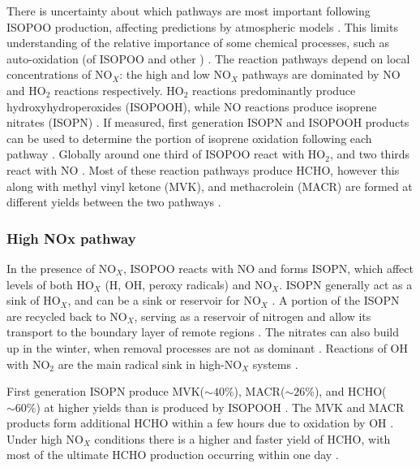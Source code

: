       There is uncertainty about which pathways are most important following ISOPOO production, affecting predictions by atmospheric models \parencite{Nguyen2014}.
      This limits understanding of the relative importance of some chemical processes, such as auto-oxidation (of ISOPOO and other \roo) \parencite{Crounse2013}.
      The reaction pathways depend on local concentrations of NO$_X$: the high and low NO$_X$ pathways are dominated by NO and HO$_2$ reactions respectively.
      HO$_2$ reactions predominantly produce hydroxyhydroperoxides (ISOPOOH), while NO reactions produce isoprene nitrates (ISOPN) \parencite{Crounse2006}.
      If measured, first generation ISOPN and ISOPOOH products can be used to determine the portion of isoprene oxidation following each pathway \parencite[eg.][]{Yu2016}.
      Globally around one third of ISOPOO react with HO$_2$, and two thirds react with NO \parencite{Paulot2009b}.
      Most of these reaction pathways produce HCHO, however this along with methyl vinyl ketone (MVK), and methacrolein (MACR) are formed at different yields between the two pathways \parencite{Marais2012, Liu2016a, Wolfe2016}.
      
      
      
    \subsubsection{High NOx pathway}
      In the presence of NO$_X$, ISOPOO reacts with NO and forms ISOPN, which affect levels of both HO$_X$ (H, OH, peroxy radicals) and NO$_X$.
      ISOPN generally act as a sink of HO$_X$, and can be a sink or reservoir for NO$_X$ \parencite[][]{Mao2013}.
      A portion of the ISOPN are recycled back to NO$_X$, serving as a reservoir of nitrogen and allow its transport to the boundary layer of remote regions \parencite{Patchen2007,Paulot2009a,Yu2016}.
      The nitrates can also build up in the winter, when removal processes are not as dominant \parencite{Lelieveld2009}.
      Reactions of OH with NO$_2$ are the main radical sink in high-NO$_X$ systems \parencite{Wolfe2012}.
      
      First generation ISOPN produce MVK($\sim 40\%$), MACR($\sim 26\%$), and HCHO($\sim 60\%$) at higher yields than is produced by ISOPOOH \parencite{Liu2013,Mao2013}.
      The MVK and MACR products form additional HCHO within a few hours due to oxidation by OH \parencite{Palmer2006}.
      Under high NO$_X$ conditions there is a higher and faster yield of HCHO, with most of the ultimate HCHO production occurring within one day \parencite{Palmer2006}.
      

